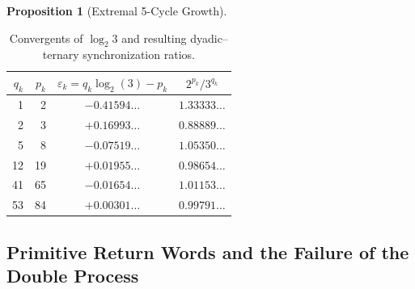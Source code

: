 \documentclass[12pt, oneside]{article}
\numberwithin{equation}{section}
\theoremstyle{definition}
\newtheorem{proposition}{Proposition}[section]
\theoremstyle{plain}
\theoremstyle{remark}
\begin{document}
\begin{proposition}[Extremal 5-Cycle Growth]





\begin{table}[ht]
\centering
\caption{Convergents of $\log_2 3$ and resulting
dyadic--ternary synchronization ratios.}
\label{tab:tower-ratios}
\begin{tabular}{r r c c}
\hline
$q_k$ & $p_k$ &
$\varepsilon_k=q_k\log_2(3)-p_k$ &
$\displaystyle 2^{p_k} / 3^{q_k}$ \\
\hline
 1 &  2 & $-0.41594\ldots$ & $1.33333\ldots$ \\
 2 &  3 & $+0.16993\ldots$ & $0.88889\ldots$ \\
 5 &  8 & $-0.07519\ldots$ & $1.05350\ldots$ \\
12 & 19 & $+0.01955\ldots$ & $0.98654\ldots$ \\
41 & 65 & $-0.01654\ldots$ & $1.01153\ldots$ \\
53 & 84 & $+0.00301\ldots$ & $0.99791\ldots$ \\
\hline
\end{tabular}
\end{table}


\subsection{Primitive Return Words and the Failure of the Double Process}


\end{proposition}
\end{document}
